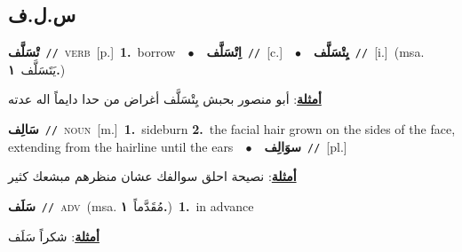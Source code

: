\documentclass[10pt,a4paper,twoside]{article} %
\begin{document}
\begin{multicols}{2}
\vspace{-3mm}
\subsection*{\color{blue}\foreignlanguage{arabic}{س.ل.ف}\color{blue}{}} 

{\setlength\topsep{0pt}\textbf{\foreignlanguage{arabic}{تْسَلَّف}}\ {\color{gray}\texttt{//}\color{black}}\ \textsc{verb}\ [p.]\ \textbf{1.}~borrow\ \ $\bullet$\ \ \setlength\topsep{0pt}\textbf{\foreignlanguage{arabic}{اِتْسَلَّف}}\ {\color{gray}\texttt{//}\color{black}}\ [c.]\ \ $\bullet$\ \ \setlength\topsep{0pt}\textbf{\foreignlanguage{arabic}{يِتْسَلَّف}}\ {\color{gray}\texttt{//}\color{black}}\ [i.]\ \color{gray}(msa. \foreignlanguage{arabic}{يَتَسَلَّف}~\foreignlanguage{arabic}{\textbf{١.}})\color{black}\  \begin{flushright}\color{gray}\foreignlanguage{arabic}{\textbf{\underline{\foreignlanguage{arabic}{أمثلة}}}: أبو منصور بحبش يِتْسَلَّف أغراض من حدا دايماً اله عدته}\end{flushright}\color{black}} \vspace{2mm}

{\setlength\topsep{0pt}\textbf{\foreignlanguage{arabic}{سَالِف}}\ {\color{gray}\texttt{//}\color{black}}\ \textsc{noun}\ [m.]\ \textbf{1.}~sideburn  \textbf{2.}~the facial hair grown on the sides of the face, extending from the hairline until the ears\ \ $\bullet$\ \ \setlength\topsep{0pt}\textbf{\foreignlanguage{arabic}{سوَالِف}}\ {\color{gray}\texttt{//}\color{black}}\ [pl.]\  \begin{flushright}\color{gray}\foreignlanguage{arabic}{\textbf{\underline{\foreignlanguage{arabic}{أمثلة}}}: نصيحة احلق سوالفك عشان منظرهم مبشعك كثير}\end{flushright}\color{black}} \vspace{2mm}

{\setlength\topsep{0pt}\textbf{\foreignlanguage{arabic}{سَلَف}}\ {\color{gray}\texttt{//}\color{black}}\ \textsc{adv}\ \color{gray}(msa. \foreignlanguage{arabic}{مُقَدَّماً}~\foreignlanguage{arabic}{\textbf{١.}})\color{black}\ \textbf{1.}~in advance\  \begin{flushright}\color{gray}\foreignlanguage{arabic}{\textbf{\underline{\foreignlanguage{arabic}{أمثلة}}}: شكراً سَلَف}\end{flushright}\color{black}} \vspace{2mm}


\end{multicols}
\end{document}
